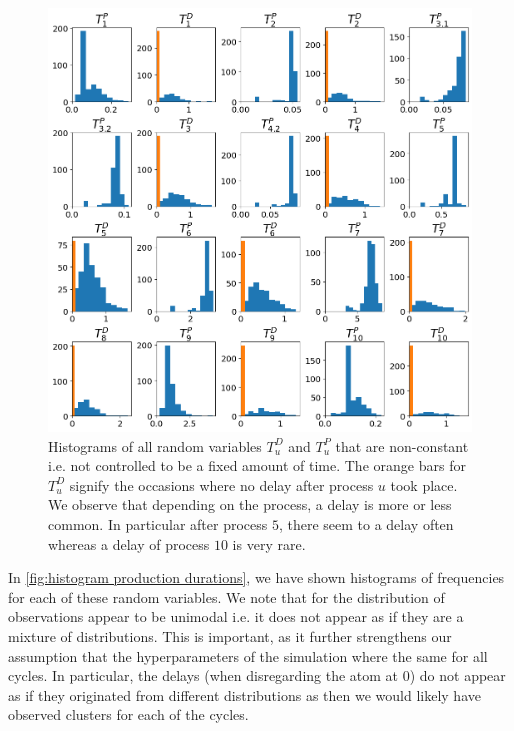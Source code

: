 \documentclass[../Thesis.tex]{subfiles}
\begin{document}
\begin{figure}[H]
    \centering
    \includegraphics[width=\linewidth]{figures/Multiple cycles data/Adding of solids/hisstograms w atoms.png}
    \caption{Histograms of all random variables $T^D_u$ and $T^P_u$ that are non-constant i.e. not controlled to be a fixed amount of time. The orange bars for $T^D_u$ signify the occasions where no delay after process $u$ took place. We observe that depending on the process, a delay is more or less common. In particular after process $5$, there seem to a delay often whereas a delay of process $10$ is very rare.}
    \label{fig:histogram production durations}
\end{figure}

In \autoref{fig:histogram production durations}, we have shown histograms of frequencies for each of these random variables. We note that for the distribution of observations appear to be unimodal i.e. it does not appear as if they are a mixture of distributions. This is important, as it further strengthens our assumption that the hyperparameters of the simulation where the same for all cycles. In particular, the delays (when disregarding the atom at $0$) do not appear as if they originated from different distributions as then we would likely have observed clusters for each of the cycles.
\end{document}
